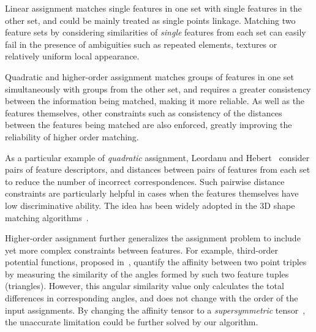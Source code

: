 Linear assignment matches single features in one set with single features in the other set, and could be mainly treated as single points linkage.
Matching two feature sets by considering similarities of \emph{single} features from each set can easily fail in the presence of ambiguities such as repeated elements,
textures or relatively uniform local appearance.

Quadratic and higher-order assignment matches groups of features in one set simultaneously with groups from the other set,
and requires a greater consistency between the information being matched, making it more reliable.
As well as the features themselves, other constraints such as consistency of the distances between the features being matched are also enforced,
greatly improving the reliability of higher order matching.

As a particular example of \emph{quadratic} assignment, Leordanu and Hebert~\cite{Leordeanu05} consider pairs of feature descriptors,
and distances between pairs of features from each set to reduce the number of incorrect correspondences.
Such pairwise distance constraints are particularly helpful in cases when the features themselves have low discriminative ability.
The idea has been widely adopted in the 3D shape matching algorithms~\cite{Tevs09,Ovsjanikov10,Tevs11,Kim11,SahilliogluY11,Windheuser11}.

Higher-order assignment further generalizes the assignment problem to include yet more complex constraints between features.
For example, third-order potential functions, proposed in~\cite{Duchenne_etal09,Zeng10,Chertok10},
quantify the affinity between two point triples by measuring the similarity of the angles formed by such two feature tuples (triangles).
However, this angular similarity value only calculates the total differences in corresponding angles,
and does not change with the order of the input assignments.
By changing the affinity tensor to a \emph{supersymmetric} tensor~\cite{Kofidis02}, the unaccurate limitation could be further solved by our algorithm.

